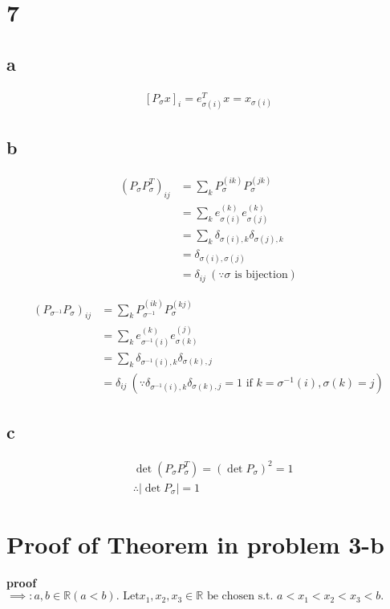 \documentclass[10pt]{article}
\begin{document}
\section*{7}
\subsection*{a}
\begin{align*}
    \left[P_{\sigma}x\right]_i = e^T_{\sigma(i)}x = x_{\sigma(i)}
\end{align*}
\subsection*{b}
\begin{align*}
    \left(P_\sigma P_\sigma^T\right)_{ij} &= \sum_k P_\sigma^{(ik)}P_\sigma^{(jk)} \\
    &= \sum_k e_{\sigma(i)}^{(k)} e_{\sigma(j)}^{(k)}\\
    &= \sum_k \delta_{\sigma(i),k} \delta_{\sigma(j),k}\\
    &= \delta_{\sigma(i),\sigma(j)}\\
    &= \delta_{ij} \ (\because \sigma \text{ is bijection})
\end{align*}

\begin{align*}
    \left(P_{\sigma^{-1}} P_\sigma\right)_{ij} &= \sum_k P_{\sigma^{-1}}^{(ik)}P_\sigma^{(kj)} \\
    &= \sum_k e_{\sigma^{-1}(i)}^{(k)}e_{\sigma(k)}^{(j)}\\
    &= \sum_k \delta_{\sigma^{-1}(i),k}\delta_{\sigma(k),j}\\
    &= \delta_{ij} \ (\because \delta_{\sigma^{-1}(i),k}\delta_{\sigma(k),j} = 1 \text{ if } k = \sigma^{-1}(i), \sigma(k) = j)
\end{align*}
\subsection*{c}
\begin{align*}
    &\det\left(P_\sigma P_\sigma^T\right) = \left(\det P_\sigma\right)^2 = 1\\
    & \therefore |\det P_\sigma| = 1
\end{align*}

\appendix
\section{Proof of Theorem in problem 3-b}
\textbf{proof}\\
$\implies :     a,b \in \mathbb{R} (a<b). \text{ Let} x_1, x_2, x_3 \in \mathbb{R} \text{ be chosen s.t. } a<x_1<x_2<x_3<b.$
\end{document}
